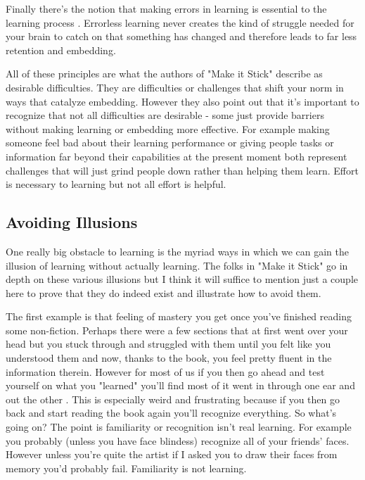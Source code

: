 \documentclass[11pt,a5paper]{book}
\begin{document}
Finally there's the notion that making errors in learning is essential to the learning process \cite{stick}. Errorless learning never creates the kind of struggle needed for your brain to catch on that something has changed and therefore leads to far less retention and embedding.
\newline

All of these principles are what the authors of "Make it Stick" \cite{stick} describe as desirable difficulties. They are difficulties or challenges that shift your norm in ways that catalyze embedding. However they also point out that it's important to recognize that not all difficulties are desirable - some just provide barriers without making learning or embedding more effective. For example making someone feel bad about their learning performance or giving people tasks or information far beyond their capabilities at the present moment both represent challenges that will just grind people down rather than helping them learn. Effort is necessary to learning but not all effort is helpful.

\subsection{Avoiding Illusions}
One really big obstacle to learning is the myriad ways in which we can gain the illusion of learning without actually learning. The folks in "Make it Stick" go in depth on these various illusions but I think it will suffice to mention just a couple here to prove that they do indeed exist and illustrate how to avoid them. 
\newline

The first example is that feeling of mastery you get once you've finished reading some non-fiction. Perhaps there were a few sections that at first went over your head but you stuck through and struggled with them until you felt like you understood them and now, thanks to the book, you feel pretty fluent in the information therein. However for most of us if you then go ahead and test yourself on what you "learned" you'll find most of it went in through one ear and out the other \cite{stick}. This is especially weird and frustrating because if you then go back and start reading the book again you'll recognize everything. So what's going on? The point is familiarity or recognition isn't real learning. For example you probably (unless you have face blindess) recognize all of your friends' faces. However unless you're quite the artist if I asked you to draw their faces from memory you'd probably fail. Familiarity is not learning.
\newline
\end{document}
